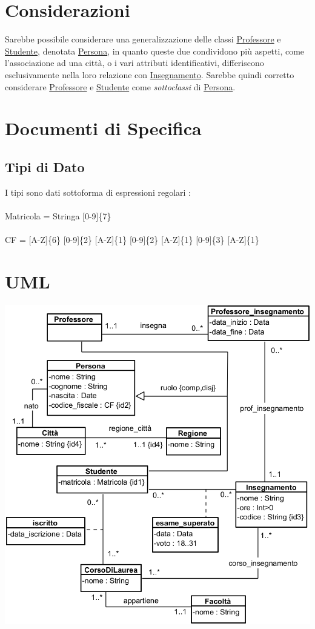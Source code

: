 \documentclass[12pt, letterpaper]{article}
\newcommand{\acc}{\\\hphantom{}\\}
\begin{document}
\section{Considerazioni}
Sarebbe possibile considerare una generalizzazione delle classi  \underline{Professore} e  \underline{Studente}, denotata 
\underline{Persona}, in quanto queste due condividono più aspetti, come l'associazione ad una città, o i vari attributi identificativi,
differiscono esclusivamente nella loro relazione con \underline{Insegnamento}. Sarebbe quindi corretto considerare 
\underline{Professore} e  \underline{Studente} come \textit{sottoclassi} di \underline{Persona}.
\section{Documenti di Specifica}
\subsection{Tipi di Dato}
I tipi sono dati sottoforma di espressioni regolari : \acc
Matricola = Stringa [0-9]\{7\}\acc 
CF = [A-Z]\{6\} [0-9]\{2\} [A-Z]\{1\} [0-9]\{2\} [A-Z]\{1\} [0-9]\{3\} [A-Z]\{1\}
\section{UML}
\includegraphics[width=\textwidth]{images/UML.png}
\end{document}
